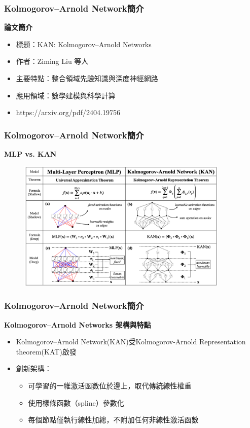 \documentclass{beamer}
\begin{document}
\begin{frame}
    \frametitle{Kolmogorov–Arnold Network簡介}
    \centering
    \textbf{論文簡介}\\[0.5cm]
    \begin{itemize}
        \item 標題：KAN: Kolmogorov–Arnold Networks
        \item 作者：Ziming Liu 等人
        \item 主要特點：整合領域先驗知識與深度神經網路
        \item 應用領域：數學建模與科學計算
        \item https://arxiv.org/pdf/2404.19756
    \end{itemize}
\end{frame}

\begin{frame}
    \frametitle{Kolmogorov–Arnold Network簡介}
    \centering
    \textbf{MLP vs. KAN}\\
    \begin{figure}               %
    \centering                 %
    \includegraphics[width=0.9\textwidth,keepaspectratio]{figures/MLP_vs_KAN.png}
    \end{figure}
\end{frame}

\begin{frame}
    \frametitle{Kolmogorov–Arnold Network簡介}
    \centering
    \textbf{Kolmogorov–Arnold Networks 架構與特點}\\[0.5cm]
    \begin{itemize}
        \item Kolmogorov–Arnold Network(KAN)受Kolmogorov-Arnold Representation theorem(KAT)啟發
        \item 創新架構：
        \begin{itemize}
            \item 可學習的一維激活函數位於邊上，取代傳統線性權重
            \item 使用樣條函數（spline）參數化
            \item 每個節點僅執行線性加總，不附加任何非線性激活函數
        \end{itemize}
    \end{itemize}
\end{frame}
\end{document}
